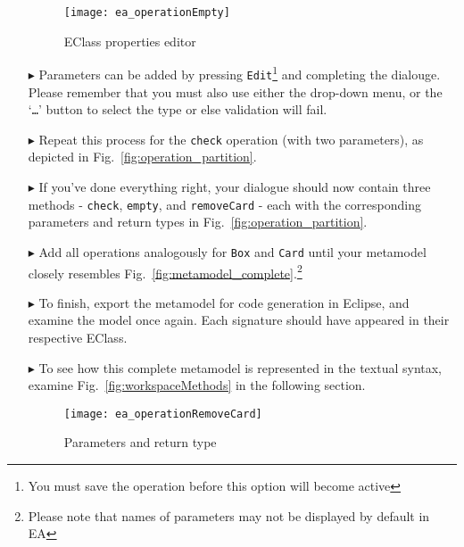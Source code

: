 \begin{enumerate}
\begin{figure}[htbp]
	\centering
  	\texttt{[image: ea\_operationEmpty]}
	\caption{EClass properties editor}
	\label{fig:operation_properties}
\end{figure}


\item[$\blacktriangleright$] Parameters can be added by pressing \texttt{Edit}\footnote{You must save the operation before this option will become active} and
completing the dialouge. Please remember that you must also use either the drop-down menu, or the `\texttt{\ldots}' button to select the type or else validation
will fail.

\item[$\blacktriangleright$] Repeat this process for the \texttt{check} operation (with two parameters), as depicted in Fig.~\ref{fig:operation_partition}. 

\item[$\blacktriangleright$] If you've done everything right, your dialogue should now contain three methods - \texttt{check}, \texttt{empty}, and
\texttt{removeCard} - each with the corresponding parameters and return types in Fig.~\ref{fig:operation_partition}.


\item[$\blacktriangleright$] Add all operations analogously for \texttt{Box} and \texttt{Card} until your metamodel closely resembles
Fig.~\ref{fig:metamodel_complete}.\footnote{Please note that names of parameters may not be displayed by default in EA}

\item[$\blacktriangleright$] To finish, export the metamodel for code generation in Eclipse, and examine the model once again. Each signature should have
appeared in their respective EClass.

\item[$\blacktriangleright$] To see how this complete metamodel is represented in the textual syntax, examine Fig.~\ref{fig:workspaceMethods} in the following
section. 

\newpage

\vspace*{1cm}

\begin{figure}[htbp]
	\centering
  \texttt{[image: ea\_operationRemoveCard]}
	\caption{Parameters and return type}
	\label{fig:operation_parameters}
\end{figure}


\end{enumerate}
